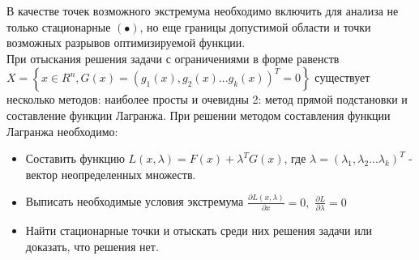 \documentclass[preprint,russian,a5paper,10pt,twoside]{ncc}
\begin{document}
В качестве точек возможного экстремума необходимо включить для анализа не только стационарные $\left( \bullet  \right)$, но еще границы допустимой области и точки возможных разрывов оптимизируемой функции.  
\\При отыскания решения задачи с ограничениями в форме равенств $X=\left\{ x\in {{R}^{n}},G\left( x \right)={{\left( {{g}_{1}}\left( x \right),{{g}_{2}}\left( x \right)...{{g}_{k}}\left( x \right) \right)}^{T}}=0 \right\}$ существует несколько методов: наиболее просты и очевидны 2: метод прямой подстановки и составление функции Лагранжа. При решении методом составления функции Лагранжа необходимо:
\begin{itemize}
\item Составить функцию $L\left( x,\lambda  \right)=F\left( x \right)+{{\lambda }^{T}}G\left( x \right)$, где $\lambda ={{\left( {{\lambda }_{1}},{{\lambda }_{2}}...{{\lambda }_{k}} \right)}^{T}}$ - вектор неопределенных множеств.
\item Выписать необходимые условия экстремума $\frac{\partial L\left( x,\lambda  \right)}{\partial x}=0,\,\,\frac{\partial L}{\partial \lambda }=0$
\item Найти стационарные точки и отыскать среди них решения задачи или доказать, что решения нет.
\end{itemize}
  
\end{document}
